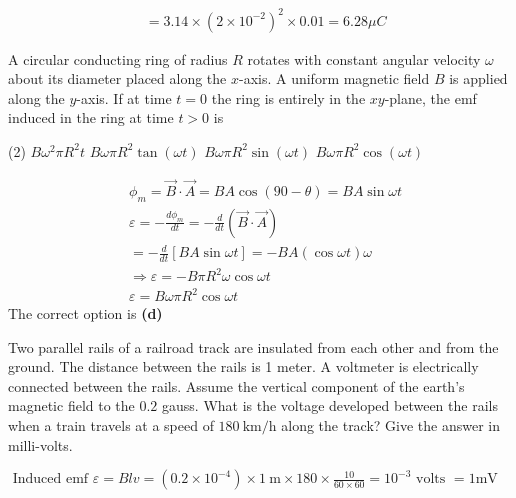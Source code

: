 \begin{enumerate}
\begin{answer}
\begin{align*}
		&=3.14 \times\left(2 \times 10^{-2}\right)^{2} \times 0.01=6.28 \mu C
		\end{align*}
	\end{answer}
	\begin{minipage}{\textwidth}
		\item A circular conducting ring of radius $R$ rotates with constant angular velocity $\omega$ about its diameter placed along the $x$-axis. A uniform magnetic field $B$ is applied along the $y$-axis. If at time $t=0$ the ring is entirely in the $x y$-plane, the emf induced in the ring at time $t>0$ is
	\end{minipage}
	\begin{tasks}(2)
		\task[\textbf{A.}] $B \omega^{2} \pi R^{2} t$
		\task[\textbf{B.}]$B \omega \pi R^{2} \tan (\omega t)$
		\task[\textbf{C.}]$B \omega \pi R^{2} \sin (\omega t)$
		\task[\textbf{D.}]$B \omega \pi R^{2} \cos (\omega t)$
	\end{tasks}
	\begin{answer}
		\begin{align*}
		&\phi_{m}=\vec{B} \cdot \vec{A}=B A \cos (90-\theta)=B A \sin \omega t\\
		&\varepsilon=-\frac{d \phi_{m}}{d t}=-\frac{d}{d t}(\vec{B} \cdot \vec{A})\\
		&=-\frac{d}{d t}[B A \sin \omega t]=-B A(\cos \omega t) \omega \\
		&\Rightarrow \varepsilon=-B \pi R^{2} \omega \cos \omega t \\
		& \varepsilon=B \omega \pi R^{2} \cos \omega t
		\end{align*}
		The correct option is \textbf{(d)}
	\end{answer}
	\begin{minipage}{\textwidth}
		\item Two parallel rails of a railroad track are insulated from each other and from the ground. The distance between the rails is 1 meter. A voltmeter is electrically connected between the rails. Assume the vertical component of the earth's magnetic field to the $0.2$ gauss. What is the voltage developed between the rails when a train travels at a speed of $180 \mathrm{~km} / \mathrm{h}$ along the track? Give the answer in milli-volts.
	\end{minipage}
	\begin{answer}
		$\text { Induced emf } \varepsilon=B l v=\left(0.2 \times 10^{-4}\right) \times 1 \mathrm{~m} \times 180 \times \frac{10}{60 \times 60}=10^{-3} \text { volts }=1 \mathrm{mV}$

\end{answer}
\end{enumerate}
